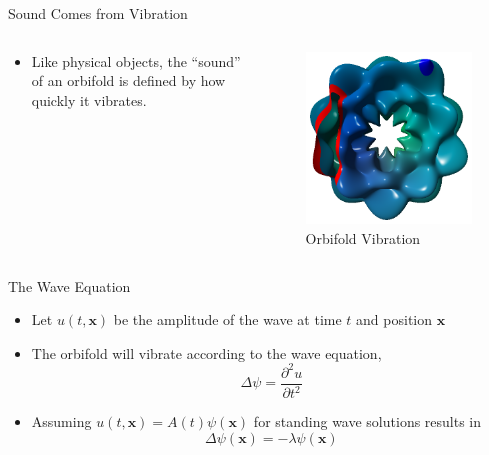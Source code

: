 \documentclass[12pt]{beamer}
\newcommand{\pdder}[2]{\frac{\partial^2#1}{\partial#2^2}}
\begin{document}
\begin{frame}{Sound Comes from Vibration}
\begin{columns}[c]
\begin{column}[c]{0.49\textwidth}
    \begin{itemize}
        \item Like physical objects, the ``sound'' of an orbifold is defined by how quickly it
            vibrates.
    \end{itemize}
\end{column}
\begin{column}[c]{0.5\textwidth}
    \begin{figure}
    \includegraphics[width=\textwidth]{images/wavey_torus.png}
    \caption{Orbifold Vibration}
    \end{figure}
\end{column}
\end{columns}
\end{frame}


\begin{frame}{The Wave Equation}
   \begin{itemize}
       \item Let $u(t,\mathbf{x})$ be the amplitude of the wave at time $t$
           and position $\mathbf{x}$
       \item The orbifold will vibrate according to the wave equation,
           $$\Delta \psi = \pdder{u}{t}$$
       \item Assuming $u(t,\mathbf{x})=A(t)\psi(\mathbf{x})$ for standing
           wave solutions results in
           $$\Delta \psi(\mathbf{x}) = -\lambda \psi(\mathbf{x})$$
   \end{itemize}
\end{frame}
\end{document}
